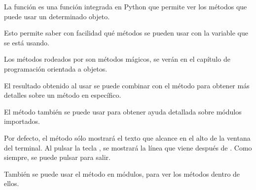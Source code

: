 La función  es una función integrada en Python que permite ver los métodos que puede usar un determinado objeto.


Esto permite saber con facilidad qué métodos se pueden usar con la variable que se está usando.


Los métodos rodeados por \ttt{\_\_} son métodos mágicos, se verán en el capítulo de programación orientada a objetos.
\medskip

El resultado obtenido al usar  se puede combinar con el método  para obtener más detalles sobre un método en específico.


El método  también se puede usar para obtener ayuda detallada sobre módulos importados.


Por defecto, el método  sólo mostrará el texto que alcance en el alto de la ventana del terminal.
Al pulsar la tecla , se mostrará la línea que viene después de .
Como siempre, se puede pulsar  para salir.
\medskip

También se puede usar el método  en módulos, para ver los métodos dentro de ellos.


\clearpage